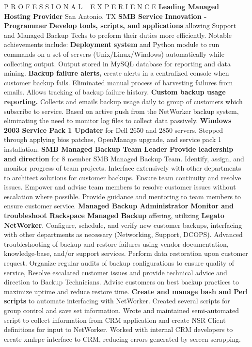\begin{rubric}{P R O F E S S I O N A L ~ E X P E R I E N C E}
		\entry*\textbf{Leading Managed Hosting Provider} San Antonio, TX
            \textbf{SMB Service Innovation - Programmer}
        \entry*\textbf{Develop tools, scripts, and applications} allowing Support and Managed Backup Techs to preform their duties more efficiently.  Notable achievements include: 
        \entry*\textbf{Deployment system} and Python module to run commands on a set of servers (Unix/Linux/Windows) automatically while collecting output.  Output stored in MySQL database for reporting and data mining.
        \entry*\textbf{Backup failure alerts,} create alerts in a centralized console when customer backup fails.  Eliminated manual process of harvesting failures from emails.  Allows tracking of backup failure history.
        \entry*\textbf{Custom backup usage reporting.}  Collects and emails backup usage daily to group of customers which subscribe to service.  Based on active push from the NetWorker backup system, eliminating the need to monitor log files to collect data passively.
        \entry*\textbf{Windows 2003 Service Pack 1 Updater} for Dell 2650 and 2850 servers.  Stepped through applying bios patches, OpenManage upgrade, and service pack 1 installation.
			\textbf{SMB Managed Backup Team Leader}
		\entry*\textbf{Provide leadership and direction} for 8 member SMB Managed Backup Team.  Identify, assign, and monitor progress of team projects.  Interface extensively with other departments to architect solutions for customer backups.  Ensure team continuity and resolve issues.  Empower and advise team members to resolve customer issues without escalation where possible.  Provide guidance and mentoring to team members to ensure customer service.
			\textbf{Managed Backup Administrator}
		\entry*\textbf{Monitor and troubleshoot Rackspace Managed Backup} offering, utilizing \textbf{Legato NetWorker}.  Configure, schedule, and verify new customer backups, interfacing with other departments as necessary (Networking, Support, DCOPS).  Advanced troubleshooting of backup and restore failures using vendor documentation, knowledge-base, and/or support services.  Perform data restoration upon customer request.  Organize regular audits of backup configurations to ensure quality of service,  Resolve escalated customer issues and provide technical advice and direction to Backup Technicians.  Advise customers on best backup practices to maximize uptime and reduce restore time.
        \entry*\textbf{Create and manage bash and Perl scripts} to automate interfacing with NetWorker.  Created several scripts for group control and save set information.  Wrote and maintained semi-automated script to collect information from CRM application and create NSR Client definitions for input to NetWorker.  Worked with internal CRM developers to create xmlrpc interface to CRM, reducing errors generated by screen scrapping.

\end{rubric}
